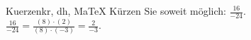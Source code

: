 \begin{MAufgabe}{Kuerzen}{kr, dh, MaTeX}
K\"urzen Sie soweit m\"oglich: $\frac{16}{-24}$.\\ 
\ifLsg\MLoesung
\quad $\frac{16}{-24}=\frac{(8)\cdot(2)}{(8)\cdot(-3)}=\frac{2}{-3}$.\else\relax\fi
 \end{MAufgabe}